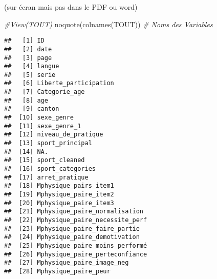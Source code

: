 \documentclass[
]{article}
\newenvironment{Shaded}{\begin{snugshade}}{\end{snugshade}}
\newcommand{\CommentTok}[1]{\textcolor[rgb]{0.56,0.35,0.01}{\textit{#1}}}
\newcommand{\FunctionTok}[1]{\textcolor[rgb]{0.00,0.00,0.00}{#1}}
\newcommand{\NormalTok}[1]{#1}
\begin{document}
(sur écran mais pas dans le PDF ou word)

\begin{Shaded}
\begin{Highlighting}[]
\CommentTok{\#View(TOUT)}
\FunctionTok{noquote}\NormalTok{(}\FunctionTok{colnames}\NormalTok{(TOUT))   }\CommentTok{\# Noms des Variables}
\end{Highlighting}
\end{Shaded}

\begin{verbatim}
##   [1] ID                                                               
##   [2] date                                                             
##   [3] page                                                             
##   [4] langue                                                           
##   [5] serie                                                            
##   [6] Liberte_participation                                            
##   [7] Categorie_age                                                    
##   [8] age                                                              
##   [9] canton                                                           
##  [10] sexe_genre                                                       
##  [11] sexe_genre_1                                                     
##  [12] niveau_de_pratique                                               
##  [13] sport_principal                                                  
##  [14] NA.                                                              
##  [15] sport_cleaned                                                    
##  [16] sport_categories                                                 
##  [17] arret_pratique                                                   
##  [18] Mphysique_pairs_item1                                            
##  [19] Mphysique_paire_item2                                            
##  [20] Mphysique_paire_item3                                            
##  [21] Mphysique_paire_normalisation                                    
##  [22] Mphysique_paire_necessite_perf                                   
##  [23] Mphysique_paire_faire_partie                                     
##  [24] Mphysique_paire_demotivation                                     
##  [25] Mphysique_paire_moins_performé                                   
##  [26] Mphysique_paire_perteconfiance                                   
##  [27] Mphysique_paire_image_neg                                        
##  [28] Mphysique_paire_peur                                             

\end{verbatim}
\end{document}
